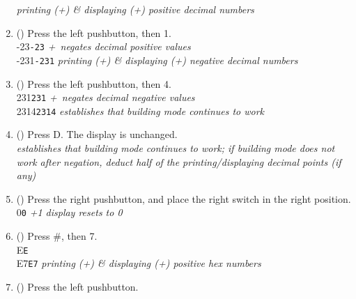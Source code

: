\begin{enumerate}
    \textit{printing (+\textonehalf) \& displaying (+\textonehalf) positive decimal numbers}
\item (\phantom{xxx}) Press the left pushbutton, then 1. \\
    {\dviiseg \phantom{00000}-23}\hspace{1cm}\texttt{-23}\hspace{1cm}
    \textit{+\textonehalf\ negates decimal positive values} \\
    {\dviiseg \phantom{0000}-231}\hspace{1cm}\texttt{-231}\hspace{1cm}
    \textit{printing (+\textonehalf) \& displaying (+\textonehalf) negative decimal numbers}
\item (\phantom{xxx}) Press the left pushbutton, then 4. \\
    {\dviiseg \phantom{00000}231}\hspace{1cm}\texttt{231}\hspace{1cm}
    \textit{+\textonehalf\ negates decimal negative values} \\
    {\dviiseg \phantom{0000}2314}\hspace{1cm}\texttt{2314}\hspace{1cm}
    \textit{establishes that building mode continues to work}
\item (\phantom{xxx}) Press D. The display is unchanged. \\
    \textit{establishes that building mode continues to work; if building mode
    does not work after negation, deduct half of the printing/displaying
    decimal points (if any)}
\item (\phantom{xxx}) Press the right pushbutton, and place the right switch in
    the right position. \\
    {\dviiseg\phantom{0000000}0}\hspace{1cm}\texttt{0}\hspace{1cm}
    \textit{+1 display resets to 0}
\item(\phantom{xxx}) Press \#, then 7. \\
    {\dviiseg \phantom{0000000}E}\hspace{1cm}\texttt{E} \\
    {\dviiseg \phantom{000000}E7}\hspace{1cm}\texttt{E7}\hspace{1cm}
    \textit{printing (+\textonehalf) \& displaying (+\textonehalf) positive hex
    numbers}
\item (\phantom{xxx}) Press the left pushbutton. \\

\end{enumerate}
